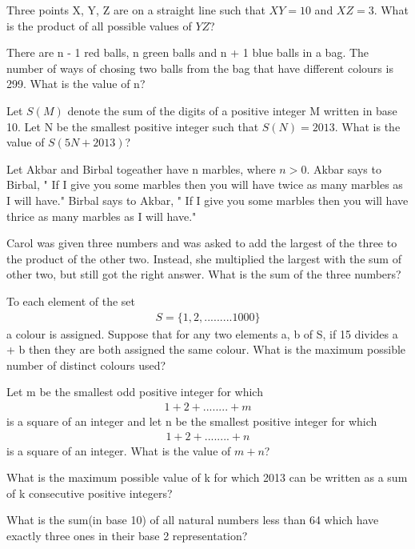 \item Three points X, Y, Z are on a straight line such that $XY = 10$ and $XZ = 3$. What is the product of all possible values of $YZ$?

\item There are  n - 1 red balls, n green balls and n + 1 blue balls in a bag. The number of ways of chosing two balls from the bag that have different colours is 299. What is the value of n?

\item Let $S(M)$ denote the sum of the digits of a positive integer M written in base 10. Let N be the smallest positive integer such that $S(N) = 2013$. What is the value of $S(5N + 2013)$?

\item Let Akbar and Birbal togeather have n marbles, where $n > 0$. Akbar says to Birbal, " If I give you some marbles then you will have twice as many marbles as I will have." Birbal says to Akbar, " If I give you some marbles then you will have thrice as many marbles as I will have."

\item Carol was given three numbers and was asked to add the largest of the three to the product of the other two. Instead, she multiplied the largest with the sum of other two, but still got the right answer. What is the sum of the three numbers?

\item To each element of the set
\begin{align*}
S = \{1, 2,.........1000\}
\end{align*}
a colour is assigned. Suppose that for any two elements a, b of S, if 15 divides a + b then they are both assigned the same colour. What is the maximum possible number of distinct colours used?

\item Let m be the smallest odd positive integer for which
\begin{align*}
1 + 2 +........+m
\end{align*}
is a square of an integer and let n be the smallest positive integer for which
\begin{align*}
1 + 2 +........+n 
\end{align*}
is a square of an integer. What is the value of $m + n$?

\item What is the maximum possible value of k for which 2013 can be written as a sum of k consecutive positive integers?

\item What is the sum(in base 10) of all natural numbers less than 64 which have exactly three ones in their base 2 representation?